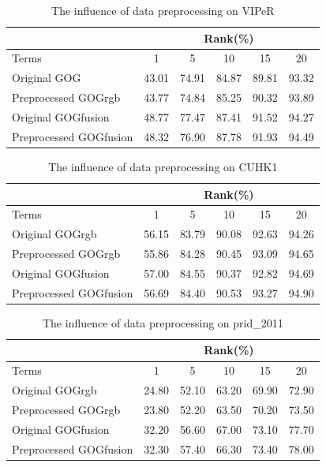 \documentclass[conference,compsoc]{IEEEtran}
\begin{document}
\begin{table}[H]
\setlength{\abovecaptionskip}{-0.1cm}
  \setlength{\belowcaptionskip}{-0.2cm}
\caption{The influence of data preprocessing on VIPeR}
\begin{tabular}{|l|c|c|c|c|c|}
\hline
 & \multicolumn{5}{|c|}{Rank(\%)} \\
 \hline
Terms  &1 &5 & 10 &15& 20\\ %
\hline
Original GOG &43.01&74.91& 84.87& 89.81& 93.32 \\
\hline
Preprocessed GOGrgb &43.77&74.84&85.25& 90.32&93.89\\
 \hline
Original GOGfusion &48.77&77.47&87.41&91.52&94.27\\
\hline
Preprocessed GOGfusion &48.32&76.90&87.78&91.93& 94.49\\
 \hline
 
\end{tabular}
\end{table}

\begin{table}[H]
\caption{The influence of data preprocessing on CUHK1}
\begin{tabular}{|l|c|c|c|c|c|}
\hline
 & \multicolumn{5}{|c|}{Rank(\%)} \\
 \hline
Terms  &1 &5 & 10 &15& 20\\
\hline
Original GOGrgb&56.15&83.79&90.08& 92.63&94.26 \\
\hline
Preprocessed GOGrgb &55.86&84.28&90.45& 93.09&94.65\\
 \hline
Original GOGfusion &57.00&84.55& 90.37& 92.82&94.69\\
\hline
Preprocessed GOGfusion &56.69&84.40& 90.53& 93.27&94.90\\
 \hline
 
\end{tabular}
\end{table}
\begin{table}[H]
\caption{The influence of data preprocessing on prid\_2011}
\begin{tabular}{|l|c|c|c|c|c|}
\hline
 & \multicolumn{5}{|c|}{Rank(\%)} \\
 \hline
Terms  &1 &5 & 10 &15& 20\\ %
\hline
Original GOGrgb&24.80& 52.10& 63.20& 69.90& 72.90\\
\hline
Preprocessed GOGrgb &23.80& 52.20& 63.50& 70.20& 73.50\\
\hline
Original GOGfusion &32.20& 56.60& 67.00& 73.10& 77.70\\
\hline
Preprocessed GOGfusion &32.30& 57.40& 66.30& 73.40& 78.00\\
 \hline
 
\end{tabular}
\end{table}
\end{document}
